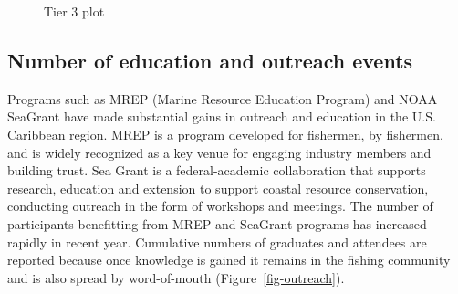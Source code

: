 \documentclass[
  letterpaper,
  oneside,
  open=any]{scrbook}
\begin{document}
\begin{figure}


\caption{\label{fig-tier3}Tier 3 plot}

\end{figure}%

\subsection{Number of education and outreach
events}\label{number-of-education-and-outreach-events}

Programs such as MREP (Marine Resource Education Program) and NOAA
SeaGrant have made substantial gains in outreach and education in the
U.S. Caribbean region. MREP is a program developed for fishermen, by
fishermen, and is widely recognized as a key venue for engaging industry
members and building trust. Sea Grant is a federal-academic
collaboration that supports research, education and extension to support
coastal resource conservation, conducting outreach in the form of
workshops and meetings. The number of participants benefitting from MREP
and SeaGrant programs has increased rapidly in recent year. Cumulative
numbers of graduates and attendees are reported because once knowledge
is gained it remains in the fishing community and is also spread by
word-of-mouth (Figure~\ref{fig-outreach}).
\end{document}
